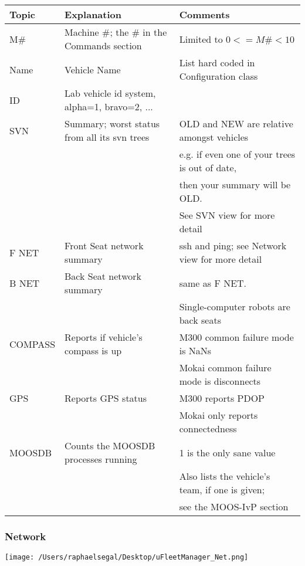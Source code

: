 \documentclass[11pt]{article}
\begin{document}
\begin{tabular}{l|ll}
Topic & Explanation & Comments\\
\hline
M\# & Machine \#; the \# in the Commands section & Limited to $0<=M\#<10$\\
Name & Vehicle Name & List hard coded in Configuration class\\
ID & Lab vehicle id system, alpha=1, bravo=2, ... & \\
SVN & Summary; worst status from all its svn trees & OLD and NEW are relative amongst vehicles\\
&& e.g. if even one of your trees is out of date,\\
&& then your summary will be OLD. \\ && See SVN view for more detail\\
F NET & Front Seat network summary & ssh and ping; see Network view for more detail\\
B NET & Back Seat network summary & same as F NET.\\
&& Single-computer robots are back seats\\
COMPASS & Reports if vehicle's compass is up & M300 common failure mode is NaNs\\&&Mokai common failure mode is disconnects\\
GPS & Reports GPS status & M300 reports PDOP\\&& Mokai only reports connectedness\\
MOOSDB &Counts the MOOSDB processes running & 1 is the only sane value\\&&Also lists the vehicle's team, if one is given; \\&& see the MOOS-IvP section\\
\end{tabular}
\subsubsection{Network}
\texttt{[image: /Users/raphaelsegal/Desktop/uFleetManager\_Net.png]}
\end{document}
